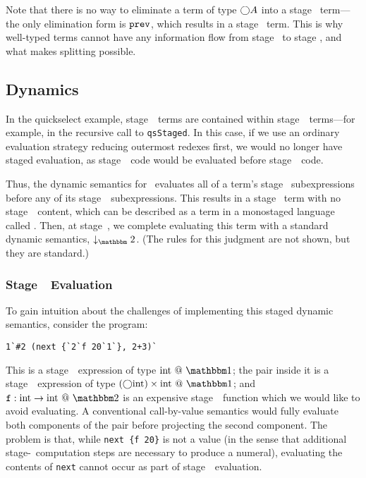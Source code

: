 Note that there is no way to eliminate a term of type $\bigcirc A$ into a stage
\bbone\ term---the only elimination form is ${\tt prev}$, which results in a stage
\bbtwo\ term. This is why well-typed terms cannot have any information flow
from stage \bbtwo\ to stage \bbone, and what makes splitting possible.

\subsection{Dynamics}
\label{sec:stagedsemantics}

In the quickselect example, stage~\bbone\ terms are contained within
stage~\bbtwo\ terms---for example, in the recursive call to {\tt qsStaged}. In
this case, if we use an ordinary evaluation strategy reducing outermost redexes
first, we would no longer have staged evaluation, as stage~\bbtwo\ code would
be evaluated before stage~\bbone\ code. 

Thus, the dynamic semantics for \lang\ evaluates all of a term's stage \bbone\
subexpressions before any of its stage~\bbtwo\ subexpressions. This results in
a stage \bbtwo\ term with no stage~\bbone\ content, 
which can be described as a term in a monostaged language called \langTwo. 
Then, at stage~\bbtwo, we complete
evaluating this term with a standard dynamic semantics, $\tworedsym$. (The
rules for this judgment are not shown, but they are standard.)

\subsubsection{Stage~\bbone\ Evaluation}

To gain intuition about the challenges of implementing this staged dynamic
semantics, consider the program:
\begin{lstlisting}
1`#2 (next {`2`f 20`1`}, 2+3)`
\end{lstlisting}
This is a stage~\bbone\ expression of type $\rmint~@~\bbone$; the pair inside it is a
stage~\bbone\ expression of type $(\fut\rmint)\times\rmint~@~\bbone$; and ${\tt f} :
\rmint \to \rmint~@~\bbtwo$ is an expensive stage~\bbtwo\ function which we would like
to avoid evaluating. A conventional call-by-value semantics would fully
evaluate both components of the pair before projecting the second component.
The problem is that, while \verb|next {f 20}| is not a value (in the sense that
additional stage-\bbtwo\ computation steps are necessary to produce a numeral),
evaluating the contents of \verb|next| cannot occur as part of stage~\bbone\
evaluation.

